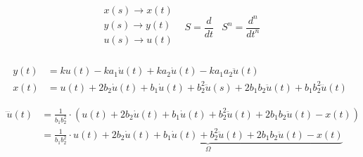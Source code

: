 \documentclass[a4paper, 12pt]{article}
\begin{document}
\vspace{1cm}

$$
    \begin{matrix}
        \begin{matrix}
            x(s) \to x(t) \\
            y(s) \to y(t) \\
            u(s) \to u(t) \\
        \end{matrix}
        &
        S = \dfrac{d}{dt}
        &
        S^n = \dfrac{d^n}{dt^n}
    \end{matrix}
$$

\vspace{1cm}

$$
    \begin{aligned}
        y(t) &= ku(t) - ka_1\dot{u}(t) + ka_2\dot{u}(t) - ka_1a_2\ddot{u}(t)
        \\
        x(t) &= u(t) + 2b_2\dot{u}(t) + b_1\dot{u}(t) + b_2^2\ddot{u}(s) + 2b_1b_2\ddot{u}(t) + b_1b_2^2\dddot{u}(t)
    \end{aligned}
$$

\vspace{1cm}

$$
    \begin{aligned}
        \dddot{u}(t)
        &= \frac{1}{b_1b_2^2} \cdot (u(t) + 2b_2\dot{u}(t) + b_1\dot{u}(t) + b_2^2\ddot{u}(t) + 2b_1b_2\ddot{u}(t) - x(t))
        \\
        &= \frac{1}{b_1b_2^2} \cdot \underbrace{u(t) + 2b_2\dot{u}(t) + b_1\dot{u}(t) + b_2^2\ddot{u}(t) + 2b_1b_2\ddot{u}(t) - x(t)}_{\Omega}
    \end{aligned}
$$
\end{document}
